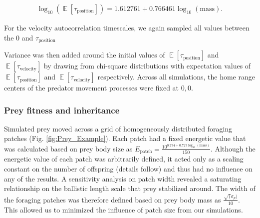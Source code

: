 \documentclass[12pt]{article}
\DeclareMathOperator{\E}{\mathbb{E}}
\begin{document}
\begin{gather}
\log_{10}(\E[\tau_\mathrm{position}]) = 1.612761 + 0.766461 \log_{10}(\mathrm{mass}).
\end{gather}

For the velocity autocorrelation timescales, we again sampled all values between the 0 and $\tau_\mathrm{position}$


Variance was then added around the initial values of $\E[\tau_\mathrm{position}]$ and $\E[\tau_\mathrm{velocity}]$ by drawing from chi-square distributions with expectation values of $\E[\tau_\mathrm{position}]$ and $\E[\tau_\mathrm{velocity}]$ respectively. Across all simulations, the home range centers of the predator movement processes were fixed at $0,0$.

\subsubsection*{Prey fitness and inheritance}

Simulated prey moved across a grid of homogeneously distributed foraging patches (Fig. \ref{fig:Prey_Example}). Each patch had a fixed energetic value that was calculated based on prey body size as $E_{\mathrm{patch}} = \frac{10^{0.774 + 0.727\log_{10}(\mathrm{mass})}}{150}$. Although the energetic value of each patch was arbitrarily defined, it acted only as a scaling constant on the number of offspring (details follow) and thus had no influence on any of the results. A sensitivity analysis on patch width revealed a saturating relationship on the ballistic length scale that prey stabilized around. The width of the foraging patches was therefore defined based on prey body mass as $\frac{\sqrt(\sigma_p)}{10}$. This allowed us to minimized the influence of patch size from our simulations. 
\end{document}

